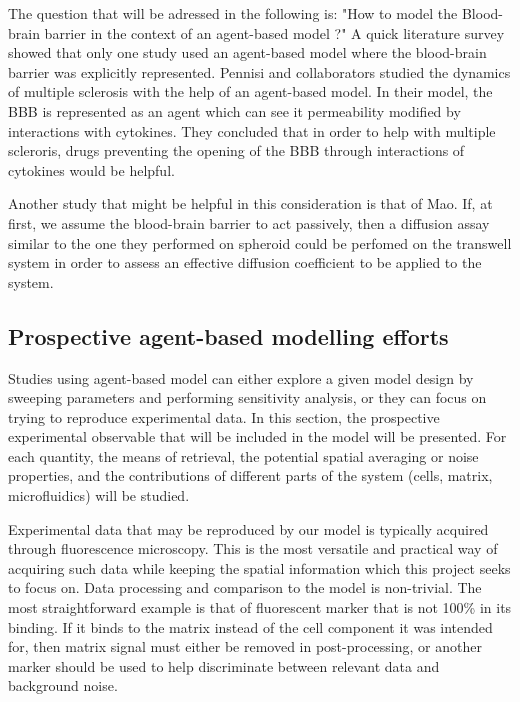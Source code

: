 \documentclass[11pt,a4paper]{article}
\begin{document}
The question that will be adressed in the following is: "How to model the Blood-brain barrier in the context of an agent-based model ?"
A quick literature survey showed that only one study used an agent-based model where the blood-brain barrier was explicitly represented. Pennisi and collaborators studied the dynamics of multiple sclerosis with the help of an agent-based model.\cite{Pennisi2015} In their model, the BBB is represented as an agent which can see it permeability modified by interactions with cytokines. They concluded that in order to help with multiple scleroris, drugs preventing the opening of the BBB through interactions of cytokines would be helpful.

Another study that might be helpful in this consideration is that of Mao.\cite{Mao2018} If, at first, we assume the blood-brain barrier to act passively, then a diffusion assay similar to the one they performed on spheroid could be perfomed on the transwell system in order to assess an effective diffusion coefficient to be applied to the system. %


\subsection{Prospective agent-based modelling efforts}
Studies using agent-based model can either explore a given model design by sweeping parameters and performing sensitivity analysis, or they can focus on trying to reproduce experimental data. In this section, the prospective experimental observable that will be included in the model will be presented. For each quantity, the means of retrieval, the potential spatial averaging or noise properties, and the contributions of different parts of the system (cells, matrix, microfluidics) will be studied.

Experimental data that may be reproduced by our model is typically acquired through fluorescence microscopy. This is the most versatile and practical way of acquiring such data while keeping the spatial information which this project seeks to focus on. Data processing and comparison to the model is non-trivial. The most straightforward example is that of fluorescent marker that is not 100\% in its binding. If it binds to the matrix instead of the cell component it was intended for, then matrix signal must either be removed in post-processing, or another marker should be used to help discriminate between relevant data and background noise.
\end{document}
